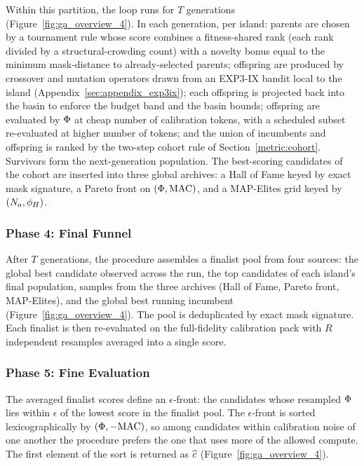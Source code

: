 Within this partition, the loop runs for $T$ generations (Figure~\ref{fig:ga_overview_4}). In each generation, per island: parents are chosen by a tournament rule whose score combines a fitness-shared rank (each rank divided by a structural-crowding count) with a novelty bonus equal to the minimum mask-distance to already-selected parents; offspring are produced by crossover and mutation operators drawn from an EXP3-IX bandit local to the island (Appendix~\ref{sec:appendix_exp3ix}); each offspring is projected back into the basin to enforce the budget band and the basin bounds; offspring are evaluated by $\Phi$ at cheap number of calibration tokens, with a scheduled subset re-evaluated at higher number of tokens; and the union of incumbents and offspring is ranked by the two-step cohort rule of Section~\ref{metric:cohort}. Survivors form the next-generation population. The best-scoring candidates of the cohort are inserted into three global archives: a Hall of Fame keyed by exact mask signature, a Pareto front on $(\Phi, \mathrm{MAC})$, and a MAP-Elites grid keyed by $(N_a, \phi_H)$.

\subsubsection{Phase 4: Final Funnel}
\label{ga:phase_funnel}

After $T$ generations, the procedure assembles a finalist pool from four sources: the global best candidate observed across the run, the top candidates of each island's final population, samples from the three archives (Hall of Fame, Pareto front, MAP-Elites), and the global best running incumbent (Figure~\ref{fig:ga_overview_4}). The pool is deduplicated by exact mask signature. Each finalist is then re-evaluated on the full-fidelity calibration pack with $R$ independent resamples averaged into a single score.

\subsubsection{Phase 5: Fine Evaluation}
\label{ga:phase_fine}

The averaged finalist scores define an $\epsilon$-front: the candidates whose resampled $\Phi$ lies within $\epsilon$ of the lowest score in the finalist pool. The $\epsilon$-front is sorted lexicographically by $(\Phi, -\mathrm{MAC})$, so among candidates within calibration noise of one another the procedure prefers the one that uses more of the allowed compute. The first element of the sort is returned as $\widehat{c}$ (Figure~\ref{fig:ga_overview_4}).

